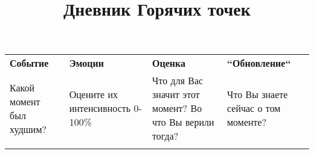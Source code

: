 \documentclass{worksheet_landscape}
\title{Дневник Горячих точек}
\begin{document}
\begin{table}[]
\begin{center}
\renewcommand{\arraystretch}{1.4}

\begin{tabularx}{\textwidth}{|Y|Y|Y|Y|}

\hline
\textbf{Событие} & \textbf{Эмоции} & \textbf{Оценка} & \textbf{``Обновление``} \\
\small{Какой момент был худшим?} & \small{Оцените их интенсивность 0-100\%} & \small{Что для Вас значит этот момент? Во что Вы верили тогда?} & \small{Что Вы знаете сейчас о том моменте?} \\
\hline
& & & \\[425pt]
\hline
\end{tabularx}
\end{center}
\label{tab:activity_diary}
\end{table}
\end{document}
